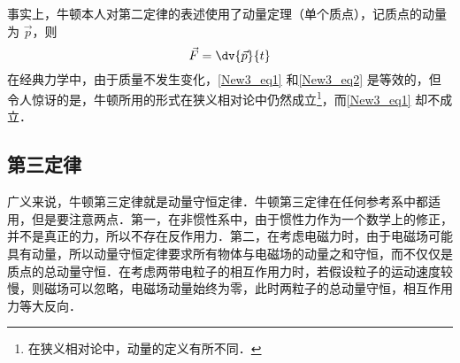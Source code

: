 事实上，牛顿本人对第二定律的表述使用了动量定理（单个质点），记质点的动量为 $\vec p$，则
\begin{equation}\label{New3_eq2}
\vec F = \dv{\vec p}{t}
\end{equation}
在经典力学中，由于质量不发生变化，\autoref{New3_eq1} 和\autoref{New3_eq2} 是等效的，但令人惊讶的是，牛顿所用的形式在狭义相对论中仍然成立\footnote{在狭义相对论中，动量的定义有所不同．}，而\autoref{New3_eq1} 却不成立．

\subsection{第三定律}
广义来说，牛顿第三定律就是动量守恒定律．牛顿第三定律在任何参考系中都适用，但是要注意两点．第一，在非惯性系中，由于惯性力作为一个数学上的修正，并不是真正的力，所以不存在反作用力．第二，在考虑电磁力时，由于电磁场可能具有动量，所以动量守恒定律要求所有物体与电磁场的动量之和守恒，而不仅仅是质点的总动量守恒．在考虑两带电粒子的相互作用力时，若假设粒子的运动速度较慢，则磁场可以忽略，电磁场动量始终为零，此时两粒子的总动量守恒，相互作用力等大反向．
